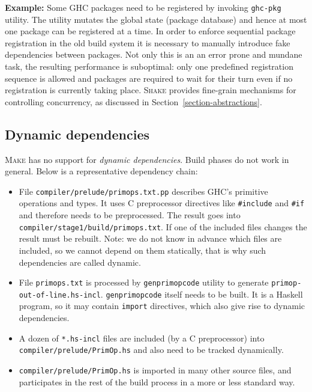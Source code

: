 \textbf{Example:} Some GHC packages need to be registered by invoking
\texttt{ghc-pkg} utility. The utility mutates the global state (package
database) and hence at most one package can be registered at a time. In order to
enforce sequential package registration in the old build system it is necessary
to manually introduce fake dependencies between packages. Not only this is an
an error prone and mundane task, the resulting performance is suboptimal: only
one predefined registration sequence is allowed and packages are required to
wait for their turn even if no registration is currently taking place.
\textsc{Shake} provides fine-grain mechanisms for controlling concurrency, as
discussed in Section~\ref{section-abstractions}. 

\subsection{Dynamic dependencies}

\textsc{Make} has no support for \emph{dynamic dependencies}. Build
phases do not work in general. Below is a representative dependency chain:

\begin{itemize}
  \item File \texttt{compiler/prelude/primops.txt.pp} describes GHC’s primitive
  operations and types. It uses C preprocessor directives like
  \texttt{\#include} and \texttt{\#if} and therefore needs to be preprocessed.
  The result goes into \texttt{compiler/stage1/build/primops.txt}. If one of the
  included files changes the result must be rebuilt. Note: we do not know in
  advance which files are included, so we cannot depend on them statically,
  that is why such dependencies are called dynamic.
  \item File \texttt{primops.txt} is processed by \texttt{genprimopcode} utility
  to generate \texttt{primop-out-of-line.hs-incl}. \texttt{genprimopcode} itself
  needs to be built. It is a Haskell program, so it may contain \texttt{import}
  directives, which also give rise to dynamic dependencies.
  \item A dozen of \texttt{*.hs-incl} files are included (by a C preprocessor)
  into \texttt{compiler/prelude/PrimOp.hs} and also need to be tracked
  dynamically.
  \item \texttt{compiler/prelude/PrimOp.hs} is imported in many other source
  files, and participates in the rest of the build process in a more or less
  standard way.
\end{itemize}

